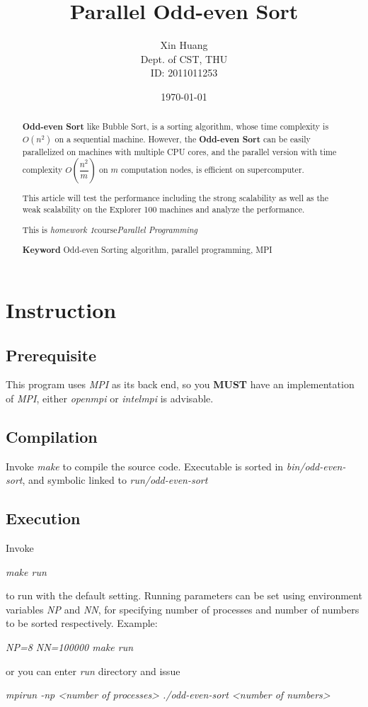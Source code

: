 \documentclass{article}
\title{Parallel Odd-even Sort}
\author{Xin Huang\\ Dept. of CST, THU\\ ID: 2011011253}
\date{\today}
\newcommand{\centerize}[1]{\begin{center} #1 \end{center}}
\newcommand{\cmd}[1]{{\it #1}}
\newcommand{\ccmd}[1]{\centerize{\cmd{#1}}}
\begin{document}
\maketitle

\begin{abstract}
	{\bf Odd-even Sort} like Bubble Sort, is a sorting algorithm,
	whose time complexity is $O(n^2)$ on a sequential machine. However,
	the {\bf Odd-even Sort} can be easily parallelized on machines
	with multiple CPU cores, and the parallel version with time complexity
	$O(\dfrac{n^2}{m})$ on $m$ computation nodes, is efficient
	on supercomputer.

	This article will test the performance including the strong scalability as well as the weak scalability on the Explorer 100 machines and analyze the performance.

	This is {\it homework 1}\for course{\it Parallel Programming}

	{\bf Keyword} Odd-even Sorting algorithm, parallel programming, MPI
\end{abstract}

\tableofcontents

\clearpage

\section{Instruction}
	\subsection{Prerequisite}
		This program uses {\it MPI} as its back end, so you {\bf MUST} have
		an implementation of {\it MPI}, either \cmd{openmpi} or \cmd{intelmpi}
		is advisable.
	\subsection{Compilation}
		Invoke \cmd{make} to compile the source code.
		Executable is sorted in \cmd{bin/odd-even-sort}, and symbolic linked
		to \cmd{run/odd-even-sort}
	\subsection{Execution}
		Invoke \ccmd{make run} to run with the default setting.
		Running parameters can be set using environment variables \cmd{NP} and \cmd{NN},
        for specifying number of processes and number of numbers to be sorted respectively.
		Example: \ccmd{NP=8 NN=100000 make run}
		or you can enter \cmd{run} directory and issue \ccmd{mpirun -np <number of processes> ./odd-even-sort <number of numbers>}
\end{document}
